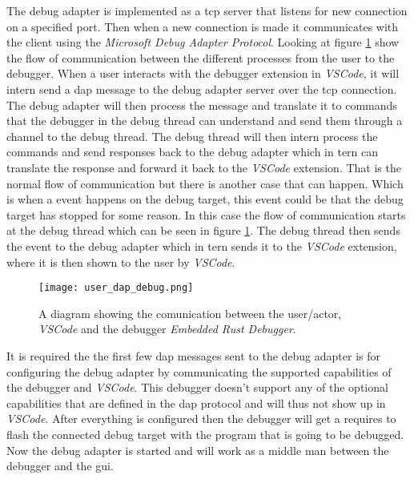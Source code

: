 
The debug adapter is implemented as a \gls{tcp} server that listens for new connection on a specified port.
Then when a new connection is made it communicates with the client using the \emph{Microsoft Debug Adapter Protocol}.
Looking at figure \ref{fig:userDAP} show the flow of communication between the different processes from the user to the debugger.
When a user interacts with the debugger extension in \emph{VSCode}, it will intern send a \acrshort{dap} message to the debug adapter server over the \gls{tcp} connection.
The debug adapter will then process the message and translate it to commands that the debugger in the debug thread can understand and send them through a channel to the debug thread.
The debug thread will then intern process the commands and send responses back to the debug adapter which in tern can translate the response and forward it back to the \emph{VSCode} extension.
That is the normal flow of communication but there is another case that can happen.
Which is when a event happens on the debug target, this event could be that the debug target has stopped for some reason.
In this case the flow of communication starts at the debug thread which can be seen in figure \ref{fig:userDAP}.
The debug thread then sends the event to the debug adapter which in tern sends it to the \emph{VSCode} extension, where it is then shown to the user by \emph{VSCode}.


\begin{figure}[h]
	\centering
	\texttt{[image: user\_dap\_debug.png]}
	\caption{A diagram showing the comunication between the user/actor, \emph{VSCode} and the debugger \emph{Embedded Rust Debugger}.}
	\label{fig:userDAP}
\end{figure}


It is required the the first few \acrshort{dap} messages sent to the debug adapter is for configuring the debug adapter by communicating the supported capabilities of the debugger and \emph{VSCode}.
This debugger doesn't support any of the optional capabilities that are defined in the \acrshort{dap} protocol and will thus not show up in \emph{VSCode}.
After everything is configured then the debugger will get a requires to flash the connected debug target with the program that is going to be debugged.
Now the debug adapter is started and will work as a middle man between the debugger and the \acrshort{gui}.


